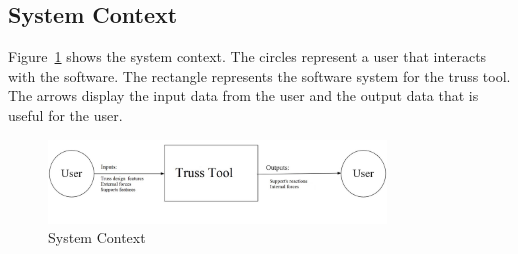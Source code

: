 \documentclass[12pt]{article}
\begin{document}
\subsection{System Context}
Figure~\ref{Fig_SystemContext} shows the system context. The circles 
represent a user that interacts with the software. The rectangle represents the software system for the truss tool. The arrows display the input data from the user and the output data that is useful for the user.

\begin{figure}[h!]
\begin{center}
 \includegraphics[width=0.8\textwidth]{systemcontext.jpg}
\caption{System Context}
\label{Fig_SystemContext} 
\end{center}
\end{figure}
\end{document}
